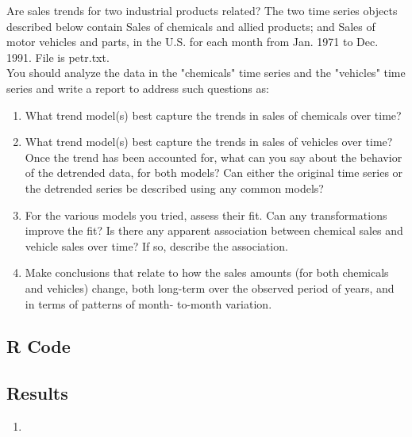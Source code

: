 Are sales trends for two industrial products related? The two time series objects described below contain Sales of chemicals and allied products; and Sales of motor vehicles and parts, in the U.S. for each month from Jan. 1971 to Dec. 1991. File is petr.txt. \\

\noindent You should analyze the data in the "chemicals" time series and the "vehicles" time series and write a report to address such questions as:
\begin{enumerate}[label=(\roman*)]
    \item What trend model(s) best capture the trends in sales of chemicals over time?
    \item What trend model(s) best capture the trends in sales of vehicles over time? Once the trend
has been accounted for, what can you say about the behavior of the detrended data, for both
models? Can either the original time series or the detrended series be described using any
common models?
    \item For the various models you tried, assess their fit. Can any transformations improve the
fit? Is there any apparent association between chemical sales and vehicle sales over time? If so,
describe the association.
    \item Make conclusions that relate to how the sales amounts (for both chemicals and vehicles)
change, both long-term over the observed period of years, and in terms of patterns of month-
to-month variation.
\end{enumerate}

\subsection{R Code}

\subsection{Results}
\begin{enumerate}[label=(\roman*)]
    \item
\end{enumerate}